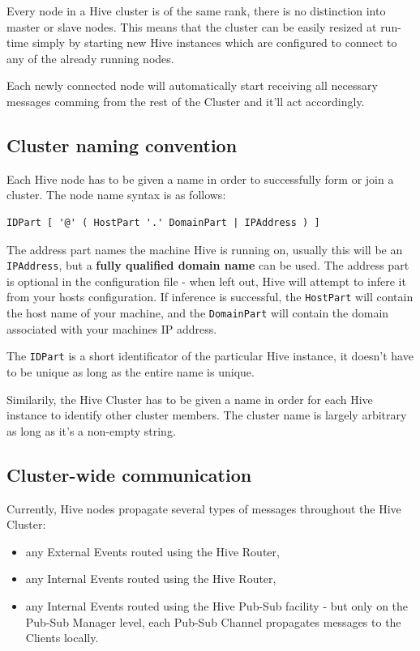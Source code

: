 \documentclass[a4paper]{article}
\begin{document}
Every node in a Hive cluster is of the same rank, there is no distinction into master or slave nodes. This means that the cluster can be easily resized at run-time simply by starting new Hive instances which are configured to connect to any of the already running nodes.

Each newly connected node will automatically start receiving all necessary messages comming from the rest of the Cluster and it'll act accordingly.
\subsection{Cluster naming convention}
\label{sec-8-2}
\label{ref-cluster-naming-convention}


Each Hive node has to be given a name in order to successfully form or join a cluster. The node name syntax is as follows:


\begin{verbatim}
IDPart [ '@' ( HostPart '.' DomainPart | IPAddress ) ]
\end{verbatim}




The address part names the machine Hive is running on, usually this will be an \texttt{IPAddress}, but a \textbf{fully qualified domain name} can be used.
The address part is optional in the configuration file - when left out, Hive will attempt to infere it from your hosts configuration. If inference is successful, the \texttt{HostPart} will contain the host name of your machine, and the \texttt{DomainPart} will contain the domain associated with your machines IP address.

The \texttt{IDPart} is a short identificator of the particular Hive instance, it doesn't have to be unique as long as the entire name is unique.

Similarily, the Hive Cluster has to be given a name in order for each Hive instance to identify other cluster members. The cluster name is largely arbitrary as long as it's a non-empty string.
\subsection{Cluster-wide communication}
\label{sec-8-3}

Currently, Hive nodes propagate several types of messages throughout the Hive Cluster:


\begin{itemize}
\item any External Events routed using the Hive Router,
\item any Internal Events routed using the Hive Router,
\item any Internal Events routed using the Hive Pub-Sub facility - but only on the Pub-Sub Manager level, each Pub-Sub Channel propagates messages to the Clients locally.
\end{itemize}
\end{document}
